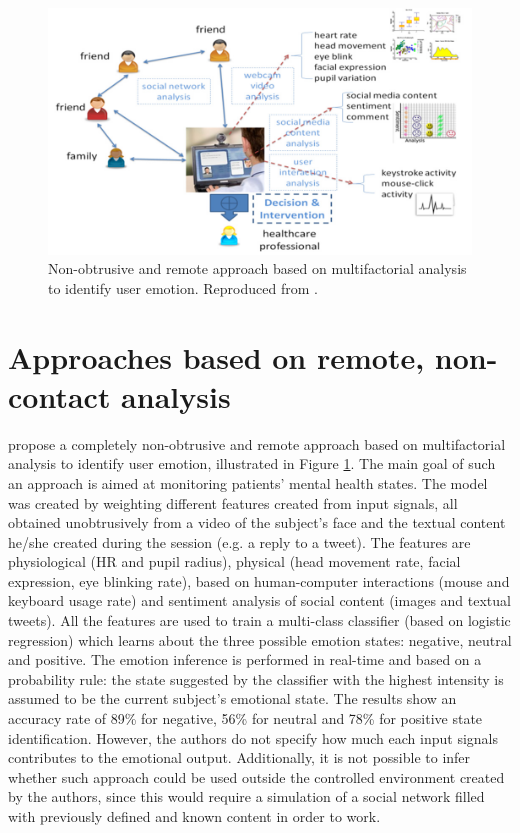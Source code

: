 \begin{figure}
\centering
\includegraphics[width=0.9\linewidth]{Content/figures/zhou.png}
\caption{Non-obtrusive and remote approach based on multifactorial analysis to identify user emotion. Reproduced from \textcite{mental}.}
\label{fig:zhou}
\end{figure}

\section{\sloppy Approaches based on remote, non-contact analysis}

\textcite{mental} propose a completely non-obtrusive and remote approach based on multifactorial analysis to identify user emotion, illustrated in Figure \ref{fig:zhou}. The main goal of such an approach is aimed at monitoring patients' mental health states. The model was created by weighting different features created from input signals, all obtained unobtrusively from a video of the subject's face and the textual content he/she created during the session (e.g. a reply to a tweet). The features are physiological (HR and pupil radius), physical (head movement rate, facial expression, eye blinking rate), based on human-computer interactions (mouse and keyboard usage rate) and sentiment analysis of social content (images and textual tweets). All the features are used to train a multi-class classifier (based on logistic regression) which learns about the three possible emotion states: negative, neutral and positive. The emotion inference is performed in real-time and based on a probability rule: the state suggested by the classifier with the highest intensity is assumed to be the current subject's emotional state. The results show an accuracy rate of 89\% for negative, 56\% for neutral and 78\% for positive state identification. However, the authors do not specify how much each input signals contributes to the emotional output. Additionally, it is not possible to infer whether such approach could be used outside the controlled environment created by the authors, since this would require a simulation of a social network filled with previously defined and known content in order to work.

